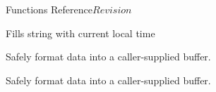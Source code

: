 \begin{cactuspart}{ Functions Reference}{}{$Revision$}
\begin{Lentry}
\item[\code{Util\_CurrentTime}] [\pageref{Util-CurrentTime}]
  Fills string with current local time

\item[\code{Util\_snprintf}]
     [\pageref{Util-snprintf}]
Safely format data into a caller-supplied buffer.

\item[\code{Util\_vsnprintf}]
     [\pageref{Util-vsnprintf}]
Safely format data into a caller-supplied buffer.















\end{Lentry}
\end{cactuspart}
